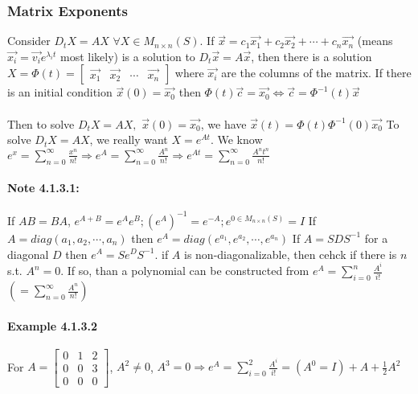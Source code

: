 \documentclass{article}
\begin{document}
\subsubsection{Matrix Exponents}
Consider $D_t X = AX$ $\forall X \in M_{n \times n}(S)$.  If $\vec{x} = c_1 \vec{x_1} + c_2 \vec{x_2} + \cdots + c_n \vec{x_n}$ (means $\vec{x_i}=\vec{v_i}e^{\lambda_i t}$ most likely) is a solution to $D_t \vec{x} = A \vec{x}$, then there is a solution $X=\Phi(t)=\begin{bmatrix} \vec{x_1} & \vec{x_2} & \cdots & \vec{x_n} \end{bmatrix}$ where $\vec{x_i}$ are the columns of the matrix.  If there is an initial condition $\vec{x} (0) = \vec{x_0}$ then $\Phi(t) \vec{c} = \vec{x_0} \Leftrightarrow \vec{c} = \Phi ^ {-1} (t) \vec{x}$
\paragraph{}
Then to solve $D_t X = AX,$ $\vec{x}(0) = \vec{x_0}$, we have $\vec{x}(t) = \Phi (t) \Phi^{-1}(0) \vec{x_0}$
\linebreak\linebreak
To solve $D_t X = AX$, we really want $X=e^{At}$.  We know $e^x = \sum\limits_{n=0}^{\infty} \frac{x^n}{n!} \Rightarrow e^A = \sum\limits_{n=0}^{\infty} \frac{A^n}{n!} \Rightarrow e^{At} = \sum\limits_{n=0}^{\infty} \frac{A^n t^n}{n!}$
\paragraph{Note 4.1.3.1:}
If $AB=BA$, $e^{A+B}=e^A e^B; (e^A)^{-1} = e^{-A}; e^{0 \in M_{n \times n} (S)} = I$
\linebreak\linebreak
If $A=diag(a_1, a_2, \cdots, a_n)$ then $e^A=diag(e^{a_1}, e^{a_2}, \cdots, e^{a_n})$
\linebreak
If $A=SDS^{-1}$ for a diagonal $D$ then $e^A=S e^D S^{-1}$.
\linebreak
if $A$ is non-diagonalizable, then cehck if there is $n$ s.t. $A^n=0$.  If so, than a polynomial can be constructed from $e^A=\sum\limits_{i=0}^n \frac{A^i}{i!}$ $\left(=\sum\limits_{n=0}^{\infty} \frac{A^n}{n!}\right)$
\paragraph{Example 4.1.3.2}
For $A=\begin{bmatrix}0&1&2 \\ 0&0&3 \\ 0&0&0 \end{bmatrix}$, $A^2 \neq 0$, $A^3=0 \Rightarrow e^A=\sum\limits_{i=0}^2 \frac{A^i}{i!}=(A^0=I)+A+\frac{1}{2}A^2$
\end{document}

